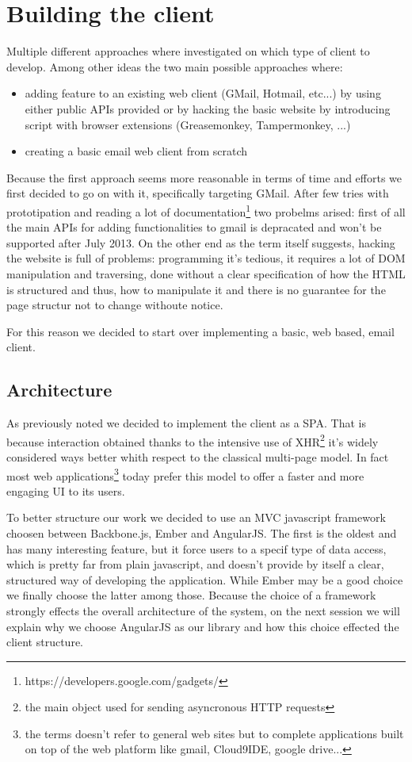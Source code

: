 \documentclass[a4paper,12pt]{report}
\begin{document}
\chapter{Building the client}
Multiple different approaches where investigated on which type of client to develop. Among other ideas the two main possible approaches where:
\begin{itemize}
\item adding feature to an existing web client (GMail, Hotmail, etc...) by using either public APIs provided or by hacking the basic website by introducing script with browser extensions (Greasemonkey, Tampermonkey, ...)
\item creating a basic email web client from scratch
\end{itemize}

Because the first approach seems more reasonable in terms of time and efforts we first decided to go on with it, specifically targeting GMail. After few tries with prototipation and reading a lot of documentation\footnote{https://developers.google.com/gadgets/} two probelms arised: first of all the main APIs for adding functionalities to gmail is depracated and won't be supported after July 2013. On the other end as the term itself suggests, hacking the website is full of problems: programming it's tedious, it requires a lot of DOM manipulation and traversing, done without a clear specification of how the HTML is structured and thus, how to manipulate it and there is no guarantee for the page structur not to change withoute notice.

For this reason we decided to start over implementing a basic, web based, email client.

\section{Architecture}
As previously noted we decided to implement the client as a SPA. That is because interaction obtained thanks to the intensive use of XHR\footnote{the main object used for sending asyncronous HTTP requests} it's widely considered ways better whith respect to the classical multi-page model. In fact most web applications\footnote{the terms doesn't refer to general web sites but to complete applications built on top of the web platform like gmail, Cloud9IDE, google drive...} today prefer this model to offer a faster and more engaging UI to its users. 

To better structure our work we decided to use an MVC javascript framework choosen between Backbone.js, Ember and AngularJS. The first is the oldest and has many interesting feature, but it force users to a specif type of data access, which is pretty far from plain javascript, and doesn't provide by itself a clear, structured way of developing the application. While Ember may be a good choice we finally choose the latter among those.
Because the choice of a framework strongly effects the overall architecture of the system, on the next session we will explain why we choose AngularJS as our library and how this choice effected the client structure.
\end{document}
